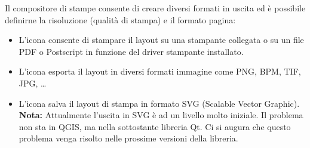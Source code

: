 Il compositore di stampe consente di creare diversi formati in uscita ed è
possibile definirne la risoluzione (qualità di stampa) e il formato pagina:

\begin{itemize}
\item L'icona  consente di stampare il
layout su una stampante collegata o su un file PDF o Postscript in funzione
del driver stampante installato.
\item L'icona 
esporta il layout in diversi formati immagine come PNG, BPM, TIF, JPG, \dots
\item L'icona  salva il layout
di stampa in formato SVG (Scalable Vector Graphic). \textbf{Nota:} Attualmente
l'uscita in SVG è ad un livello molto iniziale. Il problema non sta in QGIS,
ma nella sottostante libreria Qt. Ci si augura che questo problema venga
risolto nelle prossime versioni della libreria.
\end{itemize}

